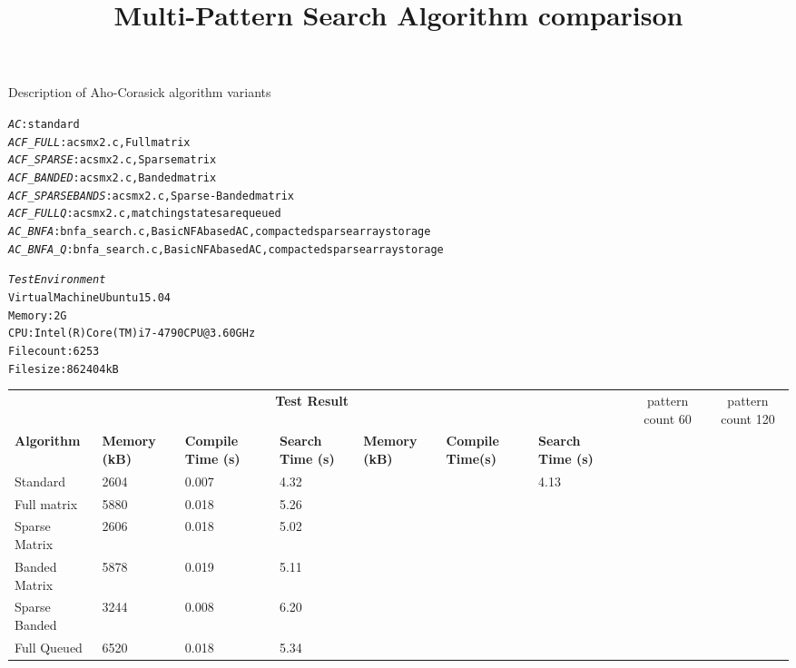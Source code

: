 \documentclass[a4paper]{article}
\begin{document}
\title{Multi-Pattern Search Algorithm comparison}
\author{}
\maketitle

Description of Aho-Corasick algorithm variants
\begin{alltt}
\emph{AC}: standard
\emph{ACF_FULL}: acsmx2.c, Full matrix
\emph{ACF_SPARSE}: acsmx2.c, Sparse matrix
\emph{ACF_BANDED}: acsmx2.c, Banded matrix
\emph{ACF_SPARSEBANDS}: acsmx2.c, Sparse-Banded matrix
\emph{ACF_FULLQ}: acsmx2.c, matching states are queued
\emph{AC_BNFA}: bnfa_search.c, Basic NFA based AC, compacted sparse array storage
\emph{AC_BNFA_Q}: bnfa_search.c, Basic NFA based AC, compacted sparse array storage
\end{alltt}

\begin{alltt}
\emph{Test Environment}
Virtual Machine Ubuntu 15.04
Memory: 2G
CPU: Intel(R) Core(TM) i7-4790 CPU @ 3.60GHz
File count: 6253
File size: 862404 kB
\end{alltt}

\begin{table}
\begin{tabular}{ |l|p{2cm}|p{2cm}|p{2cm}|p{2cm}|p{2cm}|p{2cm}| }
\multicolumn{7}{c}{\textbf{Test Result}}  &
\hline\hline
& \multicolumn{3}{|c|}{pattern count 60}  &
  \multicolumn{3}{|c|}{pattern count 120} \\
\cline{2-7}
\textbf{Algorithm} & \textbf{Memory (kB)} & \textbf{Compile Time (s)}
  & \textbf{Search Time (s)} & \textbf{Memory (kB)} & \textbf{Compile Time(s)} & \textbf{Search Time (s)} \\
\hline\hline
Standard & 2604 & 0.007 & 4.32 & & & 4.13 \\
Full matrix & 5880 & 0.018 & 5.26  & & & \\
Sparse Matrix & 2606 & 0.018 & 5.02 & & & \\
Banded Matrix & 5878 & 0.019 & 5.11 & & & \\
Sparse Banded & 3244 & 0.008 & 6.20 & & & \\
Full Queued & 6520 & 0.018 & 5.34 & & & \\
\hline
\end{tabular}
\end{table}
\end{document}
